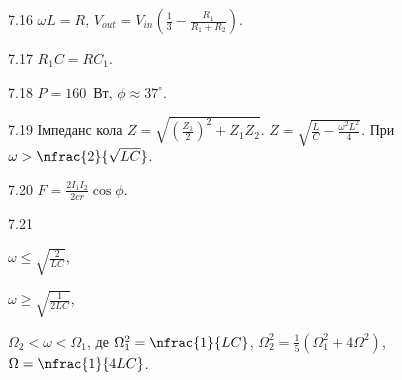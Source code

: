 \begin{Solution}{7.{16}}
	$\omega L = R$, $V_{out} = V_{in} \left( \frac13 - \frac{R_1}{R_1 + R_2}\right) $.
\end{Solution}
\begin{Solution}{7.{17}}
	$R_1C = RC_1$.
\end{Solution}
\begin{Solution}{7.{18}}
	$P = 160$~Вт, $\phi \approx 37^\circ$.
\end{Solution}
\begin{Solution}{7.{19}}
	Імпеданс кола $Z = \sqrt{\left( \frac{Z_1}{2}\right)^2 + Z_1Z_2}$.
	$Z = \sqrt{\frac{L}{C} - \frac{\omega^2L^2}{4}}$. При $\omega > \nfrac{2}{\sqrt{LC}}$.
\end{Solution}
\begin{Solution}{7.{20}}
	$F = \frac{2I_1I_2}{2cr}\cos\phi$.
\end{Solution}
\begin{Solution}{7.{21}}
	\begin{enumerate*}[label=\alph*)]
		\item $\omega \le \sqrt{\frac{2}{LC}}$,
		\item $\omega \ge \sqrt{\frac{1}{2LC}}$,
		\item $\Omega_2 < \omega < \Omega_1$, де $\Omega_1^2 = \nfrac{1}{LC} $, $\Omega_2^2 = \frac15 \left( \Omega_1^2 + 4\Omega^2\right)  $, $\Omega = \nfrac{1}{4LC}$.
	\end{enumerate*}
\end{Solution}
